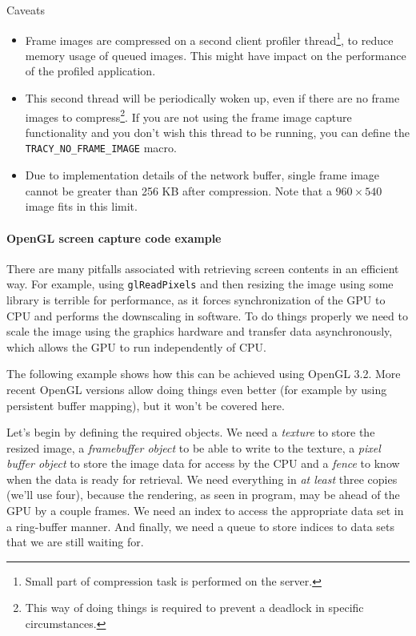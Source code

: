 \documentclass[hidelinks,titlepage,a4paper]{article}
\begin{document}
\begin{bclogo}[
noborder=true,
couleur=black!5,
logo=\bcattention
]{Caveats}
\begin{itemize}
\item Frame images are compressed on a second client profiler thread\footnote{Small part of compression task is performed on the server.}, to reduce memory usage of queued images. This might have impact on the performance of the profiled application.
\item This second thread will be periodically woken up, even if there are no frame images to compress\footnote{This way of doing things is required to prevent a deadlock in specific circumstances.}. If you are not using the frame image capture functionality and you don't wish this thread to be running, you can define the \texttt{TRACY\_NO\_FRAME\_IMAGE} macro.
\item Due to implementation details of the network buffer, single frame image cannot be greater than 256 KB after compression. Note that a $960\times540$ image fits in this limit.
\end{itemize}
\end{bclogo}

\paragraph{OpenGL screen capture code example}
\label{screenshotcode}

There are many pitfalls associated with retrieving screen contents in an efficient way. For example, using \texttt{glReadPixels} and then resizing the image using some library is terrible for performance, as it forces synchronization of the GPU to CPU and performs the downscaling in software. To do things properly we need to scale the image using the graphics hardware and transfer data asynchronously, which allows the GPU to run independently of CPU.

The following example shows how this can be achieved using OpenGL 3.2. More recent OpenGL versions allow doing things even better (for example by using persistent buffer mapping), but it won't be covered here.

Let's begin by defining the required objects. We need a \emph{texture} to store the resized image, a \emph{framebuffer object} to be able to write to the texture, a \emph{pixel buffer object} to store the image data for access by the CPU and a \emph{fence} to know when the data is ready for retrieval. We need everything in \emph{at least} three copies (we'll use four), because the rendering, as seen in program, may be ahead of the GPU by a couple frames. We need an index to access the appropriate data set in a ring-buffer manner. And finally, we need a queue to store indices to data sets that we are still waiting for.
\end{document}
